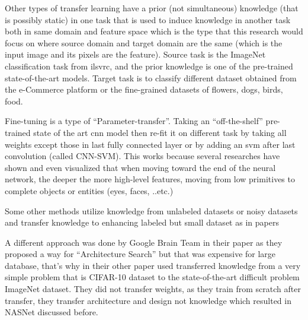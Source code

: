 
Other types of transfer learning have a prior (not simultaneous) knowledge (that is possibly static)
in one task that is used to induce knowledge in another task both in same domain and feature space
which is the type that this research would focus on where source domain and target domain are the same
(which is the input image and its pixels are the feature).
Source task is the ImageNet classification task from \gls{ilsvrc},
and the prior knowledge is one of the pre-trained state-of-the-art models.
Target task is to classify different dataset obtained from the e-Commerce platform or the fine-grained datasets of flowers,
dogs, birds, food.

Fine-tuning\autocite{zeng2016gated}\autocite{ouyang2016factors}\autocite{sharif2014cnn} is a type of ``Parameter-transfer''.
Taking an ``off-the-shelf''\autocite{sharif2014cnn} pre-trained state of the art \gls{cnn} model
then re-fit it on different task by taking all weights except those in last fully connected layer 
or by adding an \gls{svm} after last convolution (called CNN-SVM).
This works because several researches\autocite{donahue2014decaf}\autocite{girshick2014rich}\autocite{oquab2014learning}
have shown and even visualized\autocite{zeiler2014visualizing} that when moving toward the end of the neural network,
the deeper the more high-level features, moving from low primitives to complete objects or entities (eyes, faces, ..etc.)


Some other methods utilize knowledge from unlabeled datasets or noisy datasets
and transfer knowledge to enhancing labeled but small dataset as in papers\autocite{reed2014training}\autocite{sukhbaatar2014training}\autocite{sukhbaatar2014learning}\autocite{van2015building}

A different approach was done by Google Brain Team in their paper \autocite{bello2017neural}
as they proposed a way for ``Architecture Search''
but that was expensive for large database, that's why in their other paper\autocite{zoph2017learning}
used transferred knowledge from a very simple problem that is CIFAR-10 dataset to
the state-of-the-art difficult problem ImageNet\autocite{deng2009imagenet} dataset.
They did not transfer weights, as they train from scratch after transfer,
they transfer architecture and design not knowledge which resulted in NASNet discussed before.

